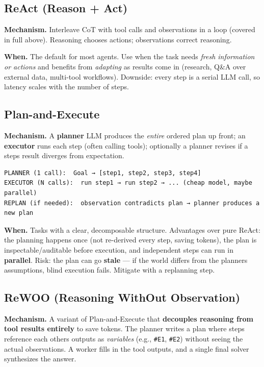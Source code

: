 \documentclass[11pt]{article}
\begin{document}
\subsection{ReAct (Reason + Act)}\label{react-reason--act}

\textbf{Mechanism.} Interleave CoT with tool calls and observations in a loop (covered in full above). Reasoning chooses actions; observations correct reasoning.

\textbf{When.} The default for most agents. Use when the task needs \emph{fresh information or actions} and benefits from \emph{adapting} as results come in (research, Q\&A over external data, multi-tool workflows). Downside: every step is a serial LLM call, so latency scales with the number of steps.

\subsection{Plan-and-Execute}\label{plan-and-execute}

\textbf{Mechanism.} A \textbf{planner} LLM produces the \emph{entire} ordered plan up front; an \textbf{executor} runs each step (often calling tools); optionally a planner revises if a step\textquotesingle s result diverges from expectation.

\setcodelang{}

\begin{verbatim}
PLANNER (1 call):  Goal → [step1, step2, step3, step4]
EXECUTOR (N calls):  run step1 → run step2 → ... (cheap model, maybe parallel)
REPLAN (if needed):  observation contradicts plan → planner produces a new plan
\end{verbatim}

\textbf{When.} Tasks with a clear, decomposable structure. Advantages over pure ReAct: the planning happens once (not re-derived every step, saving tokens), the plan is inspectable/auditable before execution, and independent steps can run in \textbf{parallel}. Risk: the plan can go \textbf{stale} --- if the world differs from the planner\textquotesingle s assumptions, blind execution fails. Mitigate with a replanning step.

\subsection{ReWOO (Reasoning WithOut Observation)}\label{rewoo-reasoning-without-observation}

\textbf{Mechanism.} A variant of Plan-and-Execute that \textbf{decouples reasoning from tool results entirely} to save tokens. The planner writes a plan where steps reference each other\textquotesingle s outputs as \emph{variables} (e.g., \texttt{\#E1}, \texttt{\#E2}) without seeing the actual observations. A worker fills in the tool outputs, and a single final solver synthesizes the answer.
\end{document}
